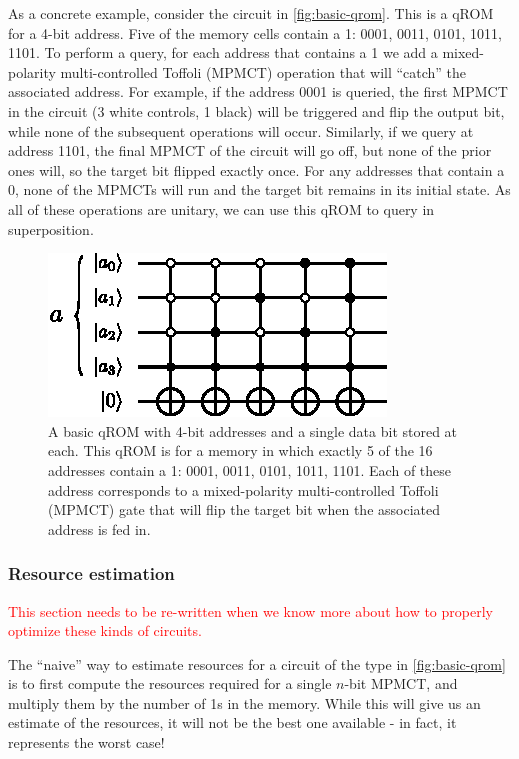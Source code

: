 \documentclass[a4paper,12pt]{article}
\newcommand\todo[1]{\textcolor{red}{#1}}
\begin{document}
As a concrete example, consider the circuit in \autoref{fig:basic-qrom}. This is a qROM for a 4-bit address. Five of the memory cells contain a 1: 0001, 0011, 0101, 1011, 1101. To perform a query, for each address that contains a 1 we add a mixed-polarity multi-controlled Toffoli (MPMCT) operation that will ``catch'' the associated address. For example, if the address 0001 is queried, the first MPMCT in the circuit (3 white controls, 1 black) will be triggered and flip the output bit, while none of the subsequent operations will occur. Similarly, if we query at address 1101, the final MPMCT of the circuit will go off, but none of the prior ones will, so the target bit flipped exactly once. For any addresses that contain a 0, none of the MPMCTs will run and the target bit remains in its initial state. As all of these operations are unitary, we can use this qROM to query in superposition. 



\begin{figure}
 \centering
 \captionsetup{width=0.89\linewidth}
 \includegraphics[scale=1.6]{images/basic-qrom}
 \caption{A basic qROM with 4-bit addresses and a single data bit stored at each. This qROM is for a memory in which exactly 5 of the 16 addresses contain a 1: 0001, 0011, 0101, 1011, 1101. Each of these address corresponds to a mixed-polarity multi-controlled Toffoli (MPMCT) gate that will flip the target bit when the associated address is fed in.}
 \label{fig:basic-qrom}
\end{figure}

\subsubsection{Resource estimation}

\todo{This section needs to be re-written when we know more about how to properly optimize these kinds of circuits.}

The ``naive'' way to estimate resources for a circuit of the type in \autoref{fig:basic-qrom} is to first compute the resources required for a single $n$-bit MPMCT, and multiply them by the number of 1s in the memory. While this will give us an estimate of the resources, it will not be the best one available - in fact, it represents the worst case!
\end{document}
